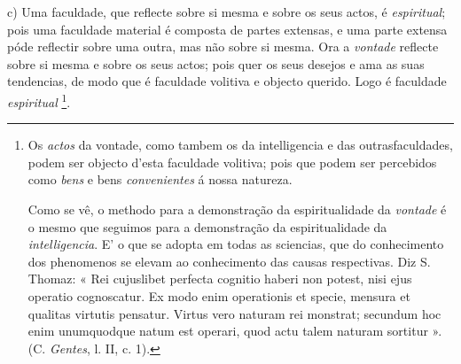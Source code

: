 c) Uma faculdade, que reflecte sobre si mesma e sobre os seus actos, é \emph{espiritual}; pois uma faculdade material é composta de partes extensas, e uma parte extensa póde reflectir sobre uma outra, mas não sobre si mesma. Ora a \emph{vontade} reflecte sobre si mesma e sobre os seus actos; pois quer os seus desejos e ama as suas tendencias, de modo que é faculdade volitiva e objecto querido. Logo é faculdade \emph{espiritual} \footnote{Os \emph{actos} da vontade, como tambem os da intelligencia e das outrasfaculdades, podem ser objecto d'esta faculdade volitiva; pois que podem ser percebidos como \emph{bens} e bens \emph{convenientes} á nossa natureza.\par Como se vê, o methodo para a demonstração da espiritualidade da \emph{vontade} é o mesmo que seguimos para a demonstração da espiritualidade da \emph{intelligencia}. E' o que se adopta em todas as sciencias, que do conhecimento dos phenomenos se elevam ao conhecimento das causas respectivas. Diz S. Thomaz: « Rei cujuslibet perfecta cognitio haberi non potest, nisi ejus operatio cognoscatur. Ex modo enim operationis et specie, mensura et qualitas virtutis pensatur. Virtus vero naturam rei monstrat; secundum hoc enim unumquodque natum est operari, quod actu talem naturam sortitur ». (C. \emph{Gentes}, l. II, c. 1).}.



